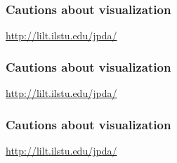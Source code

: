 \documentclass[handout]{beamer}
\begin{document}

   \begin{frame} \frametitle{Cautions about visualization}

   \begin{figure}
   \centering
   \end{figure}

   \href{http://lilt.ilstu.edu/jpda/}{http://lilt.ilstu.edu/jpda/}
   \end{frame}


   \begin{frame} \frametitle{Cautions about visualization}

   \begin{figure}
   \centering
   \end{figure}

   \href{http://lilt.ilstu.edu/jpda/}{http://lilt.ilstu.edu/jpda/}
   \end{frame}


   \begin{frame} \frametitle{Cautions about visualization}

   \begin{figure}
   \centering
   \end{figure}

   \href{http://lilt.ilstu.edu/jpda/}{http://lilt.ilstu.edu/jpda/}
   \end{frame}


   \begin{frame} 

   \end{frame}

   
\end{document}
